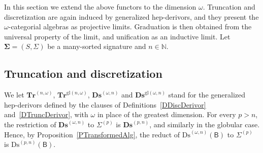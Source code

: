 \documentclass[a4paper,reqno]{amsart}
\newcommand{\sig}[1]{\mathbf{#1}}                %
\newcommand{\calg}[1]{\boldsymbol{\mathsf{#1}}}  %
\newcommand{\gl}{\mathrm{gl}}
\newcommand{\Ds}{\mathrm{Ds}}
\newcommand{\bDs}{\mathbf{Ds}}
\newcommand{\bTr}{\mathbf{Tr}}
\theoremstyle{plain}
\theoremstyle{definition}
\begin{document}
In this section we extend the above functors to the dimension $\omega$.
Truncation and discretization are again induced by generalized hep-derivors, and they present the $\omega$-categorial algebras as projective limits.
Graduation is then obtained from the universal property of the limit, and unification as an inductive limit.
Let $\sig{\Sigma}=(S,\Sigma)$ be a many-sorted signature and $n\in\mathbb{N}$.

\subsection{Truncation and discretization}

We let $\bTr^{(n,\omega)}$, $\bTr^{\gl(n,\omega)}$, $\bDs^{(\omega,n)}$ and $\bDs^{\gl(\omega,n)}$ stand for the generalized hep-derivors defined by the clauses of Definitions~\ref{DDiscDerivor} and~\ref{DTruncDerivor}, with $\omega$ in place of the greatest dimension.
For every $p>n$, the restriction of $\bDs^{(\omega,n)}$ to $\Sigma^{(p)}$ is $\bDs^{(p,n)}$, and similarly in the globular case.
Hence, by Proposition~\ref{PTransformedAlg}, the reduct of $\Ds^{(\omega,n)}(\calg{B})$ to $\Sigma^{(p)}$ is $\Ds^{(p,n)}(\calg{B})$.
\end{document}
